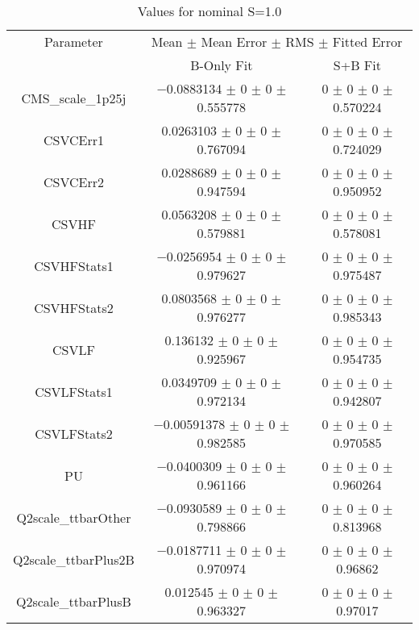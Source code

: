 \begin{table}
\centering
\caption{Values for nominal S=1.0}
\begin{tabular}{ccc}
\toprule
Parameter & \multicolumn{2}{c}{Mean $\pm$ Mean Error $\pm$ RMS $\pm$ Fitted Error}\\
 & B-Only Fit & S+B Fit\\
\midrule
CMS\_scale\_1p25j & \num{-0.0883134} $\pm$ \num{0} $\pm$ \num{0} $\pm$ \num{0.555778} & \num{0} $\pm$ \num{0} $\pm$ \num{0} $\pm$ \num{0.570224}\\
CSVCErr1 & \num{0.0263103} $\pm$ \num{0} $\pm$ \num{0} $\pm$ \num{0.767094} & \num{0} $\pm$ \num{0} $\pm$ \num{0} $\pm$ \num{0.724029}\\
CSVCErr2 & \num{0.0288689} $\pm$ \num{0} $\pm$ \num{0} $\pm$ \num{0.947594} & \num{0} $\pm$ \num{0} $\pm$ \num{0} $\pm$ \num{0.950952}\\
CSVHF & \num{0.0563208} $\pm$ \num{0} $\pm$ \num{0} $\pm$ \num{0.579881} & \num{0} $\pm$ \num{0} $\pm$ \num{0} $\pm$ \num{0.578081}\\
CSVHFStats1 & \num{-0.0256954} $\pm$ \num{0} $\pm$ \num{0} $\pm$ \num{0.979627} & \num{0} $\pm$ \num{0} $\pm$ \num{0} $\pm$ \num{0.975487}\\
CSVHFStats2 & \num{0.0803568} $\pm$ \num{0} $\pm$ \num{0} $\pm$ \num{0.976277} & \num{0} $\pm$ \num{0} $\pm$ \num{0} $\pm$ \num{0.985343}\\
CSVLF & \num{0.136132} $\pm$ \num{0} $\pm$ \num{0} $\pm$ \num{0.925967} & \num{0} $\pm$ \num{0} $\pm$ \num{0} $\pm$ \num{0.954735}\\
CSVLFStats1 & \num{0.0349709} $\pm$ \num{0} $\pm$ \num{0} $\pm$ \num{0.972134} & \num{0} $\pm$ \num{0} $\pm$ \num{0} $\pm$ \num{0.942807}\\
CSVLFStats2 & \num{-0.00591378} $\pm$ \num{0} $\pm$ \num{0} $\pm$ \num{0.982585} & \num{0} $\pm$ \num{0} $\pm$ \num{0} $\pm$ \num{0.970585}\\
PU & \num{-0.0400309} $\pm$ \num{0} $\pm$ \num{0} $\pm$ \num{0.961166} & \num{0} $\pm$ \num{0} $\pm$ \num{0} $\pm$ \num{0.960264}\\
Q2scale\_ttbarOther & \num{-0.0930589} $\pm$ \num{0} $\pm$ \num{0} $\pm$ \num{0.798866} & \num{0} $\pm$ \num{0} $\pm$ \num{0} $\pm$ \num{0.813968}\\
Q2scale\_ttbarPlus2B & \num{-0.0187711} $\pm$ \num{0} $\pm$ \num{0} $\pm$ \num{0.970974} & \num{0} $\pm$ \num{0} $\pm$ \num{0} $\pm$ \num{0.96862}\\
Q2scale\_ttbarPlusB & \num{0.012545} $\pm$ \num{0} $\pm$ \num{0} $\pm$ \num{0.963327} & \num{0} $\pm$ \num{0} $\pm$ \num{0} $\pm$ \num{0.97017}\\

\end{tabular}
\end{table}

